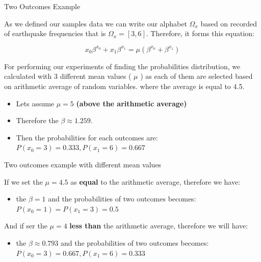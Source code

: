 \begin{frame}{Two Outcomes Example}

As we defined our samples data we can write our alphabet \( \Omega_x \) based on recorded of earthquake frequencies that is \( \Omega_x = [3,6] \). Therefore, it forms this equation:

\[ x_0 \beta^{x_0} + x_1 \beta^{x_1} = \mu( \beta^{x_0} + \beta^{x_1} ) \]  

For performing our experiments of finding the probabilities distribution, we calculated with 3 different mean values ( \(\mu\) ) as each of them are selected based on arithmetic average of random variables. where the average is equal to 4.5.

\begin{itemize}
    \item Lets assume \(\mu= 5 \) \textbf{(above the arithmetic average)}
    \item Therefore the \(\beta \approx 1.259 \).
    \item Then the probabilities for each outcomes are: \( P(x_0 = 3) = 0.333, P(x_1 = 6) = 0.667\) 
\end{itemize}
    
\end{frame}
\begin{frame}{Two outcomes example with different mean values}

If we set the \(\mu = 4.5\) as \textbf{equal} to the arithmetic average, therefore we have:
\begin{itemize}
    \item the \(\beta = 1\) and the probabilities of two outcomes becomes: \( P(x_0 = 1) = P(x_1 = 3) = 0.5 \)
\end{itemize}

And if ser the \(\mu = 4\)  \textbf{less than} the arithmetic average, therefore we will have:

\begin{itemize}
    \item the \(\beta \approx 0.793\) and the probabilities of two outcomes becomes: \( P(x_0 = 3) = 0.667, P(x_1 = 6) = 0.333 \)
\end{itemize}
    
\end{frame}

